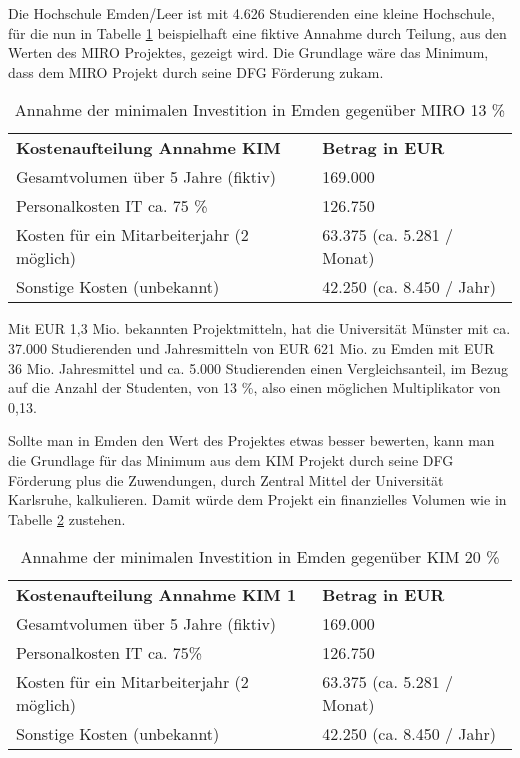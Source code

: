 
Die Hochschule Emden/Leer ist mit 4.626 Studierenden eine kleine Hochschule, für die nun in Tabelle \ref{tab_kostenaufteilung_emden_MIRO} beispielhaft eine fiktive Annahme durch Teilung, aus den Werten des MIRO Projektes, gezeigt wird. Die Grundlage wäre das Minimum, dass dem MIRO Projekt durch seine DFG Förderung zukam.

\begin{table}[h!]
	\begin{tabularx}{\textwidth}{l|l}
		\hline
		\textbf{Kostenaufteilung Annahme KIM} & \textbf{Betrag in EUR}\\
		Gesamtvolumen über 5 Jahre (fiktiv) & 169.000\\
		Personalkosten IT ca. 75 \% & 126.750\\
		Kosten für ein Mitarbeiterjahr (2 möglich) & 63.375 (ca. 5.281 / Monat)\\ 
		Sonstige Kosten (unbekannt) & 42.250 (ca. 8.450 / Jahr)\\
		\hline
	\end{tabularx}
	\caption{Annahme der minimalen Investition in Emden gegenüber MIRO 13 \%}
	\label{tab_kostenaufteilung_emden_MIRO}
\end{table}


Mit EUR 1,3 Mio. bekannten Projektmitteln, hat die Universität Münster mit ca. 37.000 Studierenden und Jahresmitteln von EUR 621 Mio. zu Emden mit EUR 36 Mio. Jahresmittel und ca. 5.000 Studierenden einen Vergleichsanteil, im Bezug auf die Anzahl der Studenten, von 13 \%, also einen möglichen Multiplikator von 0,13.

Sollte man in Emden den Wert des Projektes etwas besser bewerten, kann man die Grundlage für das Minimum aus dem KIM Projekt durch seine DFG Förderung plus die Zuwendungen, durch Zentral Mittel der Universität Karlsruhe, kalkulieren. Damit würde dem Projekt ein finanzielles Volumen wie in Tabelle \ref{tab_kostenaufteilung_emden_KIM1} zustehen.

\begin{table}[h!]
	\begin{tabularx}{\textwidth}{l|l}
		\hline
		\textbf{Kostenaufteilung Annahme KIM 1} & \textbf{Betrag in EUR}\\
		Gesamtvolumen über 5 Jahre (fiktiv) & 169.000\\
		Personalkosten IT ca. 75\% & 126.750\\
		Kosten für ein Mitarbeiterjahr (2 möglich) & 63.375 (ca. 5.281 / Monat)\\ 
		Sonstige Kosten (unbekannt) & 42.250 (ca. 8.450 / Jahr)\\
		\hline
	\end{tabularx}
	\caption{Annahme der minimalen Investition in Emden gegenüber KIM 20 \%}
	\label{tab_kostenaufteilung_emden_KIM1}
\end{table}

